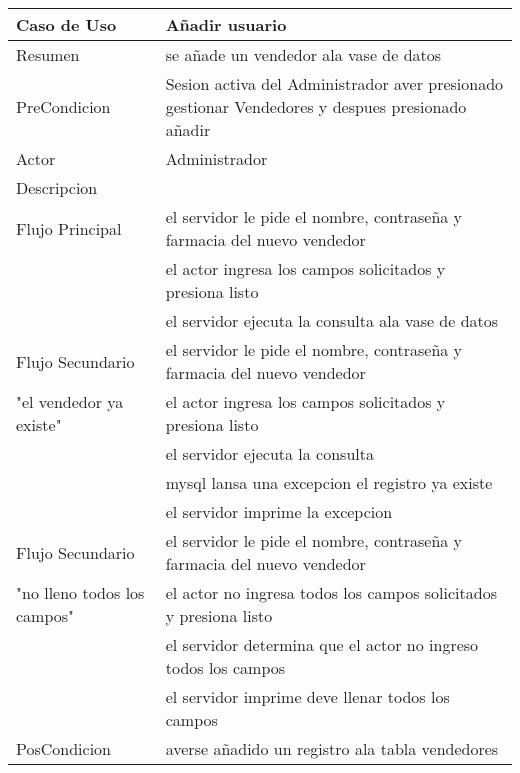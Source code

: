 \documentclass{book}
\begin{document}
	\begin{table}[H]
		\centering
		\begin{tabular}{p{3cm} p{11cm}}
			\hline
				Caso de Uso & Añadir usuario\\
			\hline 
				Resumen & se añade un vendedor ala vase de datos\\
			\hline
				PreCondicion&Sesion activa del Administrador aver presionado gestionar Vendedores y despues presionado añadir\\
			\hline
				Actor & Administrador\\
			\hline
				Descripcion&\\
				Flujo Principal&el servidor le pide el nombre, contraseña y farmacia del nuevo vendedor
					\\&el actor ingresa los campos solicitados y presiona listo
					\\&el servidor ejecuta la consulta ala vase de datos\\
			\hline
				Flujo Secundario&el servidor le pide el nombre, contraseña y farmacia del nuevo vendedor\\
				"el vendedor ya existe"&el actor ingresa los campos solicitados y presiona listo
				\\&el servidor ejecuta la consulta
				\\&mysql lansa una excepcion el registro ya existe
				\\&el servidor imprime la excepcion\\
			\hline
				Flujo Secundario&el servidor le pide el nombre, contraseña y farmacia del nuevo vendedor\\
				"no lleno todos los campos"&el actor no ingresa todos los campos solicitados y presiona listo
				\\&el servidor determina que el actor no ingreso todos los campos
				\\&el servidor imprime deve llenar todos los campos\\
			\hline
				PosCondicion&averse añadido un registro ala tabla vendedores\\
			\hline
		\end{tabular}
	\end{table}
\end{document}
